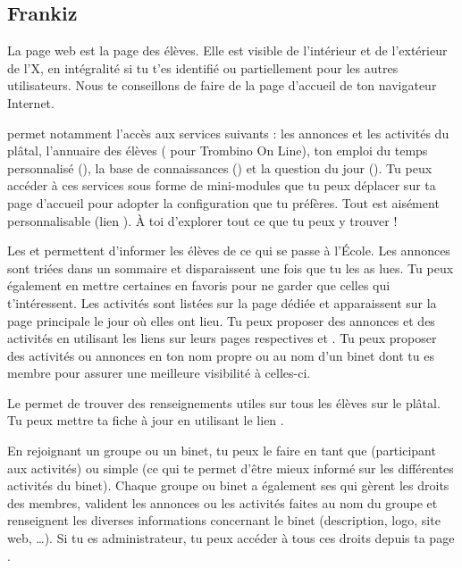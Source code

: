 \subsection{Frankiz}


\label{frankiz} La page web \fkz est la page des \'el\`eves. Elle est visible de l'int\'erieur et de
l'ext\'erieur de l'X, en int\'egralit\'e si tu t'es identifi\'e ou partiellement pour les autres
utilisateurs. Nous te conseillons de faire de  la page d'accueil de ton navigateur Internet.

\fkz permet notamment l'acc\`es aux services suivants : les
annonces et les activit\'es du pl\^atal, l'annuaire des \'el\`eves
( pour Trombino On Line), ton emploi du temps personnalis\'e (), la base de connaissances () et
la question du jour (). Tu peux accéder à ces services sous forme de mini-modules que tu peux d\'eplacer sur ta page d'accueil pour adopter la configuration que tu préfères.
Tout est ais\'ement personnalisable (lien ). \`A toi d'explorer tout ce que tu peux y trouver !

Les  et  permettent d'informer les \'el\`eves de ce qui se passe \`a  l'\'Ecole. Les annonces sont tri\'ees dans
un sommaire et disparaissent une fois que tu les as lues. Tu peux \'egalement en mettre certaines en favoris pour ne garder que celles qui t'int\'eressent. Les activit\'es sont list\'ees sur la page d\'edi\'ee et apparaissent
sur la page principale le jour o\`u elles ont lieu. Tu peux proposer des annonces et des activit\'es en utilisant les liens sur leurs pages respectives  et . Tu peux proposer des activit\'es ou annonces en ton nom propre ou au nom d'un binet dont tu es membre pour assurer une meilleure visibilit\'e \`a celles-ci.

Le  permet de trouver des renseignements utiles sur
tous les \'el\`eves sur le pl\^atal. Tu peux mettre ta fiche \`a  jour en
utilisant le lien .

En rejoignant un groupe ou un binet, tu peux le faire en tant que  (participant aux activit\'es) ou simple  (ce qui te permet d'être mieux informé sur les différentes activités du binet). Chaque groupe ou binet a \'egalement ses  qui g\`erent les droits des membres, valident les annonces ou les activit\'es faites au nom du groupe et renseignent les diverses informations concernant le binet (description, logo, site web, \dots). Si tu es administrateur, tu peux acc\'eder \`a tous ces droits depuis ta page .

